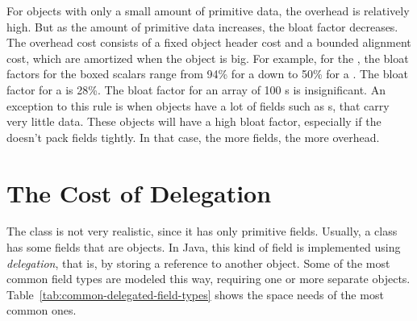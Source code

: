 
For objects with only a small amount of primitive data, the overhead is relatively high. 
But as the amount of primitive data increases, the bloat factor decreases. 
The overhead cost consists of a fixed object header cost and a bounded alignment cost,
which are amortized when the object is big.  For example, for the \oracle \jre, the bloat factors for the boxed
scalars range from 94\% for a  down to 50\% for a
.  The bloat factor for a  is 28\%.  The
bloat factor for an array of 100 s is insignificant.  
An exception to this rule is when objects
have a lot of fields such as s, that carry very little data. 
These objects will have a high bloat factor, especially if the \jre doesn't pack
fields tightly. In that case, the more fields, the more overhead.

\section{The Cost of Delegation}

The  class is not very realistic, since it has only
primitive fields. Usually, a class has some fields that are objects. In Java,
this kind of field is implemented using
\textit{delegation}, that is, by storing a reference to another object. 
Some of the most common field types are modeled this way, requiring one or more
separate objects. Table~\ref{tab:common-delegated-field-types} shows the space
needs of the most common ones.


